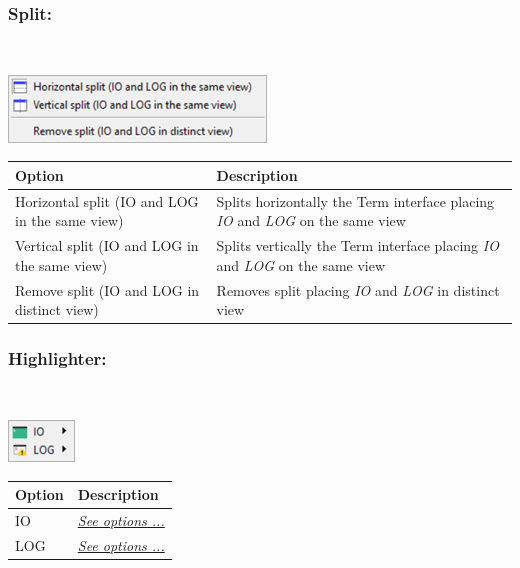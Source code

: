 \hypertarget{menu_r_term_split}{}
\subsubsection{Split:}\\

\includegraphics[scale=0.8]{./res/menu_r_term_split.png}\\

\begin{scriptsize}
  \begin{tabularx}{\headwidth}{>{\hsize=0.6\hsize}X>{\hsize=0.7\hsize}X}\\
    \hline
    \textbf{Option} & \textbf{Description} \\
    \hline
    Horizontal split (IO and LOG in the same view) & Splits horizontally the Term interface
     placing \textit{IO} and \textit{LOG} on the same view \\
    Vertical split (IO and LOG in the same view) & Splits vertically the Term interface
     placing \textit{IO} and \textit{LOG} on the same view \\
    Remove split (IO and LOG in distinct view) & Removes split placing
     \textit{IO} and \textit{LOG} in distinct view \\
    \hline
  \end{tabularx}
\end{scriptsize}

\hypertarget{menu_r_term_highlighter}{}
\subsubsection{Highlighter:}\\

\includegraphics[scale=0.8]{./res/menu_r_term_highlighter.png}\\

\begin{scriptsize}
  \begin{tabularx}{\textwidth}{>{\hsize=0.3\hsize}X>{\hsize=0.7\hsize}X}\\
    \hline
    \textbf{Option} & \textbf{Description} \\
    \hline
    IO & \textit{\href{\#menu\_r\_term\_highlighter\_IO}{See options ...}} \\
    LOG & \textit{\href{\#menu\_r\_term\_highlighter\_Log}{See options ...}} \\
    \hline
  \end{tabularx}
\end{scriptsize}

